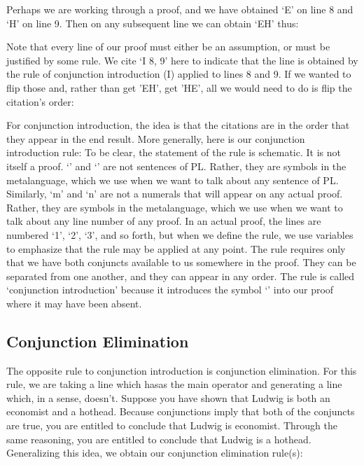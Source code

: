 Perhaps we are working through a proof, and we have obtained ‘E’ on line 8 and ‘H’ on line 9. Then on any subsequent line we can obtain ‘E\eand H’ thus:

\begin{fitchproof}
 
\end{fitchproof}
Note that every line of our proof must either be an assumption, or must be justified by some rule. We cite ‘\eand I 8, 9’ here to indicate that the line is obtained by the rule of conjunction introduction (\eand I) applied to lines 8 and 9. If we wanted to flip those and, rather than get 'E\eand H', get 'H\eand E', all we would need to do is flip the citation's order:

\begin{fitchproof}
 
\end{fitchproof}
For conjunction introduction, the idea is that the citations are in the order that they appear in the end result. More generally, here is our conjunction introduction rule:
To be clear, the statement of the rule is schematic. It is not itself a proof. ‘’ and ‘’ are not sentences of PL. Rather, they are symbols in the metalanguage, which we use when we want to talk about any sentence of PL. Similarly, ‘m’ and ‘n’ are not a numerals that will appear on any actual proof. Rather, they are symbols in the metalanguage, which we use when we want to talk about any line number of any proof. In an actual proof, the lines are numbered ‘1’, ‘2’, ‘3’, and so forth, but when we define the rule, we use variables to emphasize that the rule may be applied at any point. The rule requires only that we have both conjuncts available to us somewhere in the proof. They can be separated from one another, and they can appear in any order. The rule is called ‘conjunction introduction’ because it introduces the symbol ‘\eand ’ into our proof where it may have been absent.

\subsection{Conjunction Elimination}

The opposite rule to conjunction introduction is conjunction elimination. For this rule, we are taking a line which has\eand  as the main operator and generating a line which, in a sense, doesn't. Suppose you have shown that Ludwig is both an economist and a hothead. Because conjunctions imply that both of the conjuncts are true, you are entitled to conclude that Ludwig is economist. Through the same reasoning, you are entitled to conclude that Ludwig is a hothead. Generalizing this idea, we obtain our conjunction elimination rule(s):

